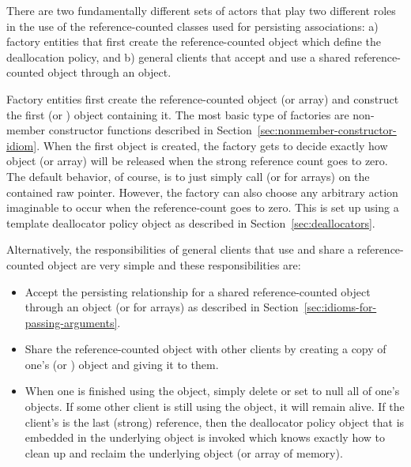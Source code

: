 \documentclass[pdf,ps2pdf,11pt]{SANDreport}
\begin{document}
There are two fundamentally different sets of actors that play two
different roles in the use of the reference-counted classes used for
persisting associations: a) factory entities that first create the
reference-counted object {} which define the deallocation
policy, and b) general clients that accept and use a shared
reference-counted object {} through an {} object.

Factory entities first create the reference-counted object (or array)
and construct the first {} (or {}) object
containing it.  The most basic type of factories are non-member
constructor functions described in
Section~\ref{sec:nonmember-constructor-idiom}.  When the first
{} object is created, the factory gets to decide exactly how
object (or array) will be released when the strong reference count
goes to zero.  The default behavior, of course, is to just simply call
{} (or {} for arrays) on the contained raw
pointer.  However, the factory can also choose any arbitrary action
imaginable to occur when the reference-count goes to zero.  This is
set up using a template deallocator policy object as described in
Section~\ref{sec:deallocators}.

Alternatively, the responsibilities of general clients that use and
share a reference-counted object are very simple and these
responsibilities are:

\begin{itemize}

{}\item Accept the persisting relationship for a shared
reference-counted object through an {} object (or
{} for arrays) as described in
Section~\ref{sec:idioms-for-passing-arguments}.

{}\item Share the reference-counted object with other clients by
creating a copy of one's {} (or {}) object and
giving it to them.

{}\item When one is finished using the object, simply delete or set to
null all of one's {} objects.  If some other client is still
using the object, it will remain alive.  If the client's is the last
(strong) reference, then the deallocator policy object that is
embedded in the underlying {} object is invoked which
knows exactly how to clean up and reclaim the underlying object (or
array of memory).

\end{itemize}
\end{document}
